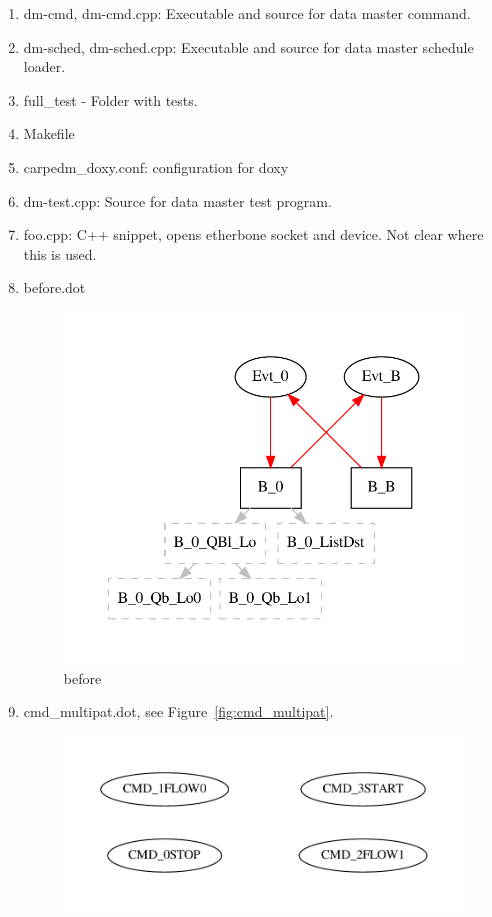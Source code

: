 \documentclass[12pt,a4paper]{report}
\begin{document}
\begin{enumerate}
\item dm-cmd, dm-cmd.cpp: Executable and source for data master command.
\item dm-sched, dm-sched.cpp: Executable and source for data master schedule loader.
\item full\_test - Folder with tests.
\item Makefile
\item carpedm\_doxy.conf: configuration for doxy
\item dm-test.cpp: Source for data master test program.
\item foo.cpp: C++ snippet, opens etherbone socket and device. Not clear where this is used.
\item before.dot
    \begin{figure}
        \centering
        \includegraphics{TestPattern/before.pdf}
        \caption{before}
        \label{fig:before}
    \end{figure}
\item cmd\_multipat.dot, see Figure~\ref{fig:cmd_multipat}.
    \begin{figure}
        \centering
        \includegraphics*[width=1.0\textwidth,keepaspectratio]{TestPattern/cmd_multipat.pdf}

\end{figure}
\end{enumerate}
\end{document}
